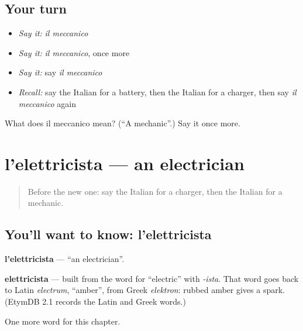 \subsection*{Your turn}
\begin{itemize}
\raggedright
  \item \emph{Say it:} \emph{il meccanico}
  \item \emph{Say it:} \emph{il meccanico}, once more
  \item \emph{Say it:} say \emph{il meccanico}
  \item \emph{Recall:} say the Italian for a battery, then the Italian for a charger, then say \emph{il meccanico} again
\end{itemize}

\begin{tcolorbox}[breakable,colback=teal!4,colframe=teal!35!black,title={Before you move on}]
What does il meccanico mean? (\textquotedblleft{}A mechanic\textquotedblright{}.) Say it once more.
\end{tcolorbox}
\section[l'elettricista]{l'elettricista — an electrician}

\label{lesson:IT-C163-elettricista}



\begin{quote}
Before the new one: say the Italian for a charger, then the Italian for a mechanic.
\end{quote}

\subsection*{You'll want to know: l'elettricista}
\textbf{l'elettricista} — \textquotedblleft{}an electrician\textquotedblright{}.

\begin{cousinweb}
\textbf{elettricista} — built from the word for \textquotedblleft{}electric\textquotedblright{} with \emph{-ista}. That word goes back to Latin \emph{electrum}, \textquotedblleft{}amber\textquotedblright{}, from Greek \emph{elektron}: rubbed amber gives a spark. (EtymDB 2.1 records the Latin and Greek words.)
\end{cousinweb}

\begin{grammarlens}[title={What you've built}]
One more word for this chapter.
\end{grammarlens}


